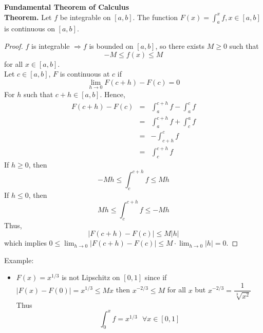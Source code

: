\documentclass[10pt,letterpaper]{article}
\begin{document}
	{\color{green}\textbf{Fundamental Theorem of Calculus }} \\
	\textbf{Theorem. } Let $f$ be integrable on $[a, b]$. The function
	$F(x) = \displaystyle\int_{a}^{x} f, x \in [a, b]$
	is continuous on $[a, b]$.
	\begin{proof}
	$f$ is integrable $\Rightarrow f$ is bounded on $[a, b]$, so
	there exists $M \geq 0$ such that 	
	$$-M \leq f(x) \leq M$$
	for all $x \in [a, b]$. \\
	Let $c \in [a, b]$, $F$ is continuous at $c$ if 
	$$\displaystyle\lim_{h\to 0}F(c + h) - F(c) = 0$$
	For $h$ such that $c + h \in [a, b]$. Hence,
	\begin{eqnarray*}
	F(c + h) - F(c) &=&
	\displaystyle\int_{a}^{c+h} f - \displaystyle\int_{a}^{c} f \\
	&=& \displaystyle\int_{a}^{c + h} f + \displaystyle\int_{c}^{a} f \\ 
	&=& - \displaystyle\int_{c+h}^{c} f \\
	&=& \displaystyle\int_{c}^{c + h} f 
	\end{eqnarray*}
	If $h \geq 0$, then
	$$-Mh \leq \displaystyle\int_{c}^{c+h} f \leq M h$$
	If $h \leq 0$, then
	$$Mh \leq \displaystyle\int_{c}^{c+h} f \leq -M h$$	
	Thus,
	$$|F(c + h) - F(c)| \leq M|h|$$
	which implies $0 \leq \displaystyle\lim_{h\to 0}|F(c + h) - F(c)| \leq M \cdot \displaystyle\lim_{h\to 0}|h| = 0$. 
	\end{proof}
	Example: \\
	\begin{itemize}
		\item $F(x) = x^{1/3}$ is not Lipschitz on $[0, 1]$ since
		if $|F(x) - F(0)| = x^{1/3} \leq Mx$ then 
		$x^{-2/3} \leq M$ for all $x$ but 
		$x^{-2/3} = \dfrac{1}{\sqrt[3]{x^2}}$
		Thus
		$$\displaystyle\int_{0}^{x} f = x^{1/3} \, \, \, \,  \forall x \in [0, 1]$$
	\end{itemize}
	
\end{document}

